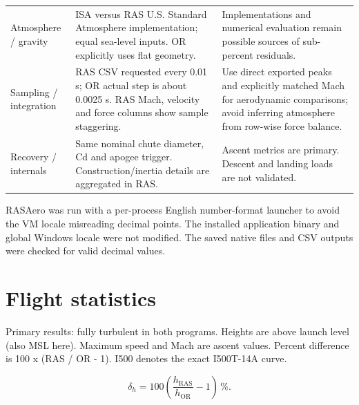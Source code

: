 \documentclass[oneside,openany]{amsdtx}
\begin{document}
{\begin{longtable}{@{}L{0.160\textwidth}L{0.440\textwidth}L{0.340\textwidth}@{}}
Atmosphere / gravity & ISA versus RAS U.S. Standard Atmosphere implementation; equal sea-level inputs. OR explicitly uses flat geometry. & Implementations and numerical evaluation remain possible sources of sub-percent residuals.\\
Sampling / integration & RAS CSV requested every 0.01 s; OR actual step is about 0.0025 s. RAS Mach, velocity and force columns show sample staggering. & Use direct exported peaks and explicitly matched Mach for aerodynamic comparisons; avoid inferring atmosphere from row-wise force balance.\\
Recovery / internals & Same nominal chute diameter, Cd and apogee trigger. Construction/inertia details are aggregated in RAS. & Ascent metrics are primary. Descent and landing loads are not validated.\\
\end{longtable}}

RASAero was run with a per-process English number-format launcher to avoid the VM locale misreading decimal points. The installed application binary and global Windows locale were not modified. The saved native files and CSV outputs were checked for valid decimal values.


\clearpage\section{Flight statistics}

Primary results: fully turbulent in both programs. Heights are above launch level (also MSL here). Maximum speed and Mach are ascent values. Percent difference is 100 x (RAS / OR - 1). I500 denotes the exact I500T-14A curve.


\begin{equation}\delta_h=100\left(\frac{h_{\mathrm{RAS}}}{h_{\mathrm{OR}}}-1\right)\,\%.\label{eq:apogee-difference}\end{equation}
\end{document}
